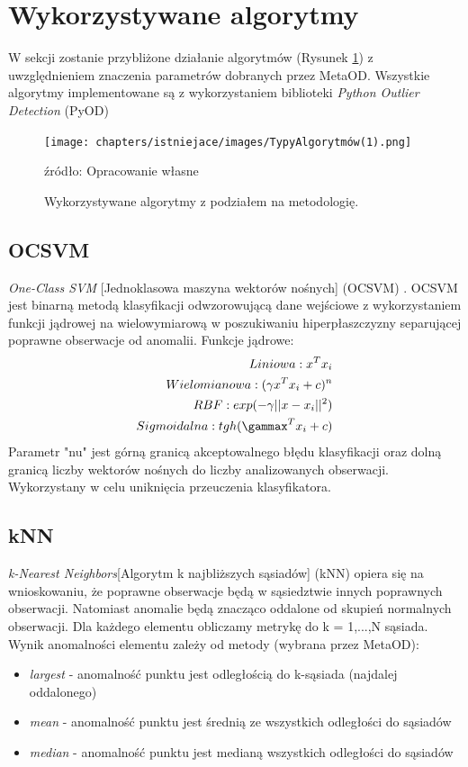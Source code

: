 \section{Wykorzystywane algorytmy}
\label{ref:Algorytmy}
W sekcji zostanie przybliżone działanie algorytmów (Rysunek \ref{fig:typy}) z uwzględnieniem znaczenia parametrów dobranych przez MetaOD.
Wszystkie algorytmy implementowane są z wykorzystaniem biblioteki \textit{Python Outlier Detection} (PyOD) \cite{zhao2019pyod}
\begin{figure}
    \centering
    \texttt{[image: chapters/istniejace/images/TypyAlgorytmów(1).png]}
    \caption{Wykorzystywane algorytmy z podziałem na metodologię.}
    \footnotesize{źródło: Opracowanie własne}
    \label{fig:typy}
\end{figure}

\subsection{OCSVM}
\textit{One-Class SVM} [Jednoklasowa maszyna wektorów nośnych] (OCSVM) \cite{ocsvm}. OCSVM jest binarną metodą klasyfikacji odwzorowującą dane wejściowe z wykorzystaniem funkcji jądrowej na wielowymiarową w poszukiwaniu hiperpłaszczyzny separującej poprawne obserwacje od anomalii.  
Funkcje jądrowe:
\begin{align*}
    Liniowa: x^Tx_i \\
    Wielomianowa: (\gamma x^Tx_i+c)^n \\
    RBF: exp(-\gamma ||x-x_i||^2) \\
    Sigmoidalna: tgh(\gammax^Tx_i+c)
\end{align*}
Parametr "nu" jest górną granicą akceptowalnego błędu klasyfikacji oraz dolną granicą liczby wektorów nośnych do liczby analizowanych obserwacji. Wykorzystany w celu uniknięcia przeuczenia klasyfikatora. 
\label{eq:funjadro}

\subsection{kNN}
\label{knn}
\textit{k-Nearest Neighbors}[Algorytm k najbliższych sąsiadów] (kNN) \cite{knn} opiera się na wnioskowaniu, że poprawne obserwacje będą w sąsiedztwie innych poprawnych obserwacji. Natomiast anomalie będą znacząco oddalone od skupień normalnych obserwacji. Dla każdego elementu obliczamy metrykę do k = 1,...,N sąsiada. Wynik anomalności elementu zależy od metody (wybrana przez MetaOD):
\begin{itemize}
    \item \textit{largest} - anomalność punktu jest odległością do k-sąsiada (najdalej oddalonego)
    \item \textit{mean} - anomalność punktu jest średnią ze wszystkich odległości do sąsiadów
    \item \textit{median} - anomalność punktu jest medianą wszystkich odległości do sąsiadów
\end{itemize}

